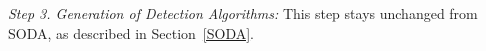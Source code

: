 \vspace{0.10cm}
\noindent \emph{Step 3. Generation of Detection Algorithms:}  This step stays unchanged from SODA, as described in Section~\ref{SODA}.